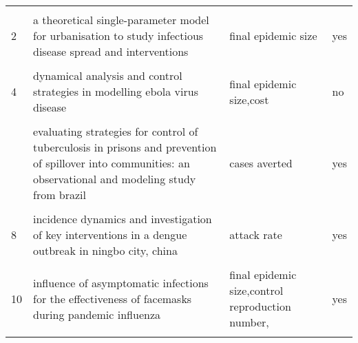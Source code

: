 \documentclass[
]{article}
\begin{document}
\begin{landscape}
\begin{longtable}{l>{\raggedright\arraybackslash}p{4cm}>{\raggedright\arraybackslash}p{6cm}l}
\endfoot
\bottomrule
\endlastfoot
\cellcolor{gray!6}{1} & \cellcolor{gray!6}{a cholera metapopulation model interlinking migration with intervention strategies - a case study of zimbabwe (2008-2009)} & \cellcolor{gray!6}{cases averted,final epidemic size,cost,case fatality} & \cellcolor{gray!6}{no}\\
2 & a theoretical single-parameter model for urbanisation to study infectious disease spread and interventions & final epidemic size & yes\\
\cellcolor{gray!6}{3} & \cellcolor{gray!6}{assessing the effects of modeling the spectrum of clinical symptoms on the dynamics and control of ebola} & \cellcolor{gray!6}{final epidemic size} & \cellcolor{gray!6}{yes}\\
4 & dynamical analysis and control strategies in modelling ebola virus disease & final epidemic size,cost & no\\
\cellcolor{gray!6}{5} & \cellcolor{gray!6}{effect of a hepatitis a vaccination campaign during a hepatitis a outbreak in taiwan, 2015–2017: a modeling study} & \cellcolor{gray!6}{cases averted} & \cellcolor{gray!6}{yes}\\
\addlinespace
6 & evaluating strategies for control of tuberculosis in prisons and prevention of spillover into communities: an observational and modeling study from brazil & cases averted & yes\\
\cellcolor{gray!6}{7} & \cellcolor{gray!6}{evaluating the effects of control interventions and estimating the inapparent infections for dengue outbreak in hangzhou, china} & \cellcolor{gray!6}{cases averted,final epidemic size} & \cellcolor{gray!6}{yes}\\
8 & incidence dynamics and investigation of key interventions in a dengue outbreak in ningbo city, china & attack rate & yes\\
\cellcolor{gray!6}{9} & \cellcolor{gray!6}{incorporating media data into a model of infectious disease transmission} & \cellcolor{gray!6}{final epidemic size} & \cellcolor{gray!6}{yes}\\
10 & influence of asymptomatic infections for the effectiveness of facemasks during pandemic influenza & final epidemic size,control reproduction number, & yes\\
\addlinespace
\cellcolor{gray!6}{11} & \cellcolor{gray!6}{mathematical analysis of a cholera infection model with vaccination strategy} & \cellcolor{gray!6}{intervention coverage,outbreak duration and timing,final epidemic size,attack rate} & \cellcolor{gray!6}{yes}\\

\end{longtable}
\end{landscape}
\end{document}
